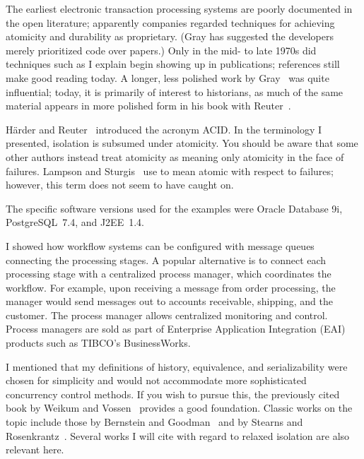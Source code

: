 The earliest electronic transaction processing systems are poorly
documented in the open literature; apparently companies regarded
techniques for achieving atomicity and durability as proprietary.
(Gray has suggested the developers merely prioritized code over
papers.)  Only in the mid- to late 1970s did techniques such as I
explain begin showing up in publications;
references \cite{max1005,max1007,max1050,max1004} still make good reading today.  A
longer, less polished work by Gray~\cite{max1056} was quite
influential; today, it is primarily of interest to historians, as much
of the same material appears in more polished form in his book with Reuter~\cite{max1009}.

H{\"a}rder and Reuter~\cite{max1001} introduced the acronym ACID.  In the
terminology I presented, isolation is subsumed under atomicity.  You
should be aware that some other authors instead treat atomicity as
meaning only atomicity in the face of failures.  Lampson and Sturgis~\cite{max1050}
use  to mean atomic with respect to failures; however,
this term does not seem to have caught on.

The specific
software versions used for the examples were Oracle Database 9i,
PostgreSQL~7.4, and J2EE~1.4.

I showed how workflow systems can be configured with message queues connecting the processing stages. A popular alternative is to connect each processing stage with a centralized process manager, which coordinates the workflow. For example,
upon receiving a message from order processing, the manager would send messages out to accounts receivable, shipping, and the customer. The process manager allows centralized monitoring and control. Process managers are sold as part of Enterprise Application Integration (EAI) products such as TIBCO's BusinessWorks.

I mentioned that my definitions of history, equivalence, and
serializability were chosen for simplicity and would not accommodate
more sophisticated concurrency control methods.  If you wish to pursue
this, the previously cited book by Weikum and
Vossen~\cite{max1085} provides a good
foundation.  Classic works on the topic include those by Bernstein and
Goodman~\cite{max1003,max1013} and by Stearns and Rosenkrantz~\cite{max1014}.  Several works I will cite with regard
to relaxed isolation are also relevant here.


